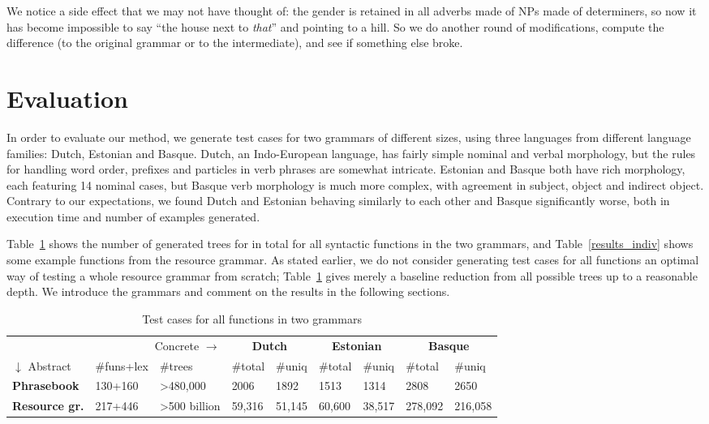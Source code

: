 \documentclass[11pt]{article}
\begin{document}
\noindent We notice a side effect that we may not have thought of: the
gender is retained in all adverbs made of NPs made of determiners, so
now it has become impossible to say ``the house next to \emph{that}'' and
pointing to a hill. So we do another round of modifications, compute
the difference (to the original grammar or to the intermediate), and
see if something else broke.

\section{Evaluation}

In order to evaluate our method, we generate test cases for two
grammars of different sizes, using three languages from different
language families: Dutch, Estonian and Basque. Dutch, an Indo-European
language, has fairly simple nominal and verbal morphology, but the
rules for handling word order, prefixes and particles in verb phrases
are somewhat intricate. Estonian and Basque both have rich morphology,
each featuring 14 nominal cases, but Basque verb morphology is much
more complex, with agreement in subject, object and indirect
object. Contrary to our expectations, we found Dutch and Estonian
behaving similarly to each other and Basque significantly worse, both
in execution time and number of examples generated. 

Table~\ref{results} shows the number of generated trees for 
in total for all syntactic functions in the two grammars, and
Table~\ref{results_indiv} shows some example functions from the
resource grammar. 
As stated earlier, we do not consider generating test cases for all
functions an optimal way of testing a whole resource grammar from scratch;
Table~\ref{results} gives merely a baseline reduction from all
possible trees up to a reasonable depth. We introduce the grammars and
comment on the results in the following sections.

\begin{table}[h]
\centering
\begin{tabular}{|lll|ll|ll|ll|}
\hline
\multicolumn{3}{|r}{Concrete $\rightarrow$}              &
                                                                   \multicolumn{2}{|c}{\bf Dutch} & \multicolumn{2}{|c}{\bf Estonian} & \multicolumn{2}{|c|}{\bf Basque} \\
$\downarrow$ Abstract  & \#funs+lex & \#trees  &
                                                                 \#total & \#uniq & \#total & \#uniq  & \#total  & \#uniq \\ \hline
{\bf Phrasebook}       & 130+160         & \textgreater{}480,000       & 2006  & 1892    & 1513     & 1314   & 2808    & 2650   \\ \hline
{\bf Resource gr.} & 217+446         & \textgreater{}500 billion   & 59,316 & 51,145  & 60,600    & 38,517   & 278,092  & 216,058\\ \hline
\end{tabular}
\caption{Test cases for all functions in two grammars}
\label{results}
\end{table}
\end{document}
